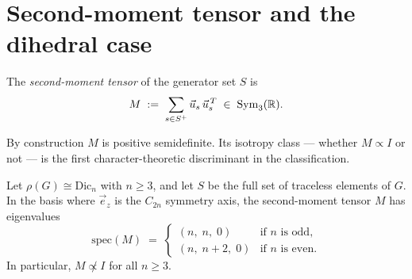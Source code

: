 \section{Second-moment tensor and the dihedral case}
  \label{sec:M}

  \begin{definition}
    The \emph{second-moment tensor} of the generator set $S$ is
    \begin{equation}
      M \;:=\; \sum_{s \in S^+} \vec{u}_s\,\vec{u}_s^{\,T} \;\in\; \mathrm{Sym}_3(\mathbb{R}).
      \label{eq:M-def}
    \end{equation}
  \end{definition}

  By construction $M$ is positive semidefinite.
  Its isotropy class --- whether $M \propto I$ or not --- is the first
  character-theoretic discriminant in the classification.

  \begin{proposition}
    \label{prop:dic-anisotropy}
    Let $\rho(G) \cong \mathrm{Dic}_n$ with $n \ge 3$, and let $S$ be the full set of
    traceless elements of $G$.
    In the basis where $\vec{e}_z$ is the $C_{2n}$ symmetry axis, the second-moment
    tensor $M$ has eigenvalues
    \begin{equation}
      \mathrm{spec}(M) \;=\;
      \begin{cases}
        (n,\; n,\; 0)   & \text{if $n$ is odd,} \\
      (n,\; n+2,\; 0) & \text{if $n$ is even.}
      \end{cases}
      \label{eq:dic-eigenvalues}
    \end{equation}
    In particular, $M \not\propto I$ for all $n \ge 3$.
  \end{proposition}

